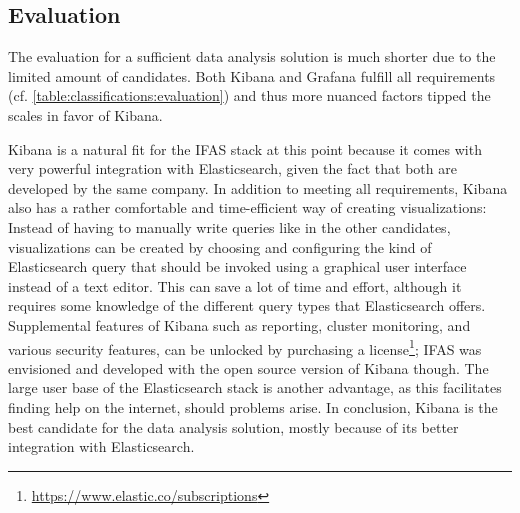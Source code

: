 \subsection{Evaluation}

The evaluation for a sufficient data analysis solution is much shorter due to the limited amount of candidates.
Both Kibana and Grafana fulfill all requirements (cf. \cref{table:classifications:evaluation}) and thus more nuanced factors tipped the scales in favor of Kibana.

\begin{table}[t]
\centering
\caption[Classification of data analysis solutions.]{
Classification of data analysis solutions.
As all solutions meet all requirements, more nuanced differences decide about the ideal candidate.}
\label{table:classifications:evaluation}
\end{table}

Kibana is a natural fit for the \ac{IFAS} stack at this point because it comes with very powerful integration with Elasticsearch, given the fact that both are developed by the same company.
In addition to meeting all requirements, Kibana also has a rather comfortable and time-efficient way of creating visualizations:
Instead of having to manually write queries like in the other candidates, visualizations can be created by choosing and configuring the kind of Elasticsearch query that should be invoked using a graphical user interface instead of a text editor.
This can save a lot of time and effort, although it requires some knowledge of the different query types that Elasticsearch offers.
Supplemental features of Kibana such as reporting, cluster monitoring, and various security features, can be unlocked by purchasing a license\footnote{\url{https://www.elastic.co/subscriptions}}; \ac{IFAS} was envisioned and developed with the open source version of Kibana though.
The large user base of the Elasticsearch stack is another advantage, as this facilitates finding help on the internet, should problems arise.
In conclusion, Kibana is the best candidate for the data analysis solution, mostly because of its better integration with Elasticsearch.

